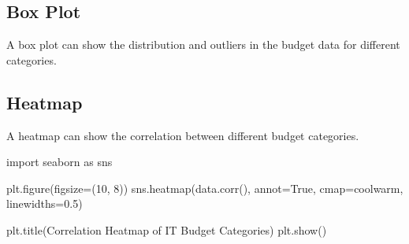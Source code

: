 \documentclass[
  letterpaper,
  DIV=11,
  numbers=noendperiod]{scrreprt}
\newenvironment{Shaded}{\begin{snugshade}}{\end{snugshade}}
\newcommand{\DecValTok}[1]{\textcolor[rgb]{0.68,0.00,0.00}{#1}}
\newcommand{\FloatTok}[1]{\textcolor[rgb]{0.68,0.00,0.00}{#1}}
\newcommand{\ImportTok}[1]{\textcolor[rgb]{0.00,0.46,0.62}{#1}}
\newcommand{\NormalTok}[1]{\textcolor[rgb]{0.00,0.23,0.31}{#1}}
\newcommand{\OperatorTok}[1]{\textcolor[rgb]{0.37,0.37,0.37}{#1}}
\newcommand{\StringTok}[1]{\textcolor[rgb]{0.13,0.47,0.30}{#1}}
\newcommand{\VariableTok}[1]{\textcolor[rgb]{0.07,0.07,0.07}{#1}}
\begin{document}
\subsection{Box Plot}\label{box-plot}

A box plot can show the distribution and outliers in the budget data for
different categories.

\begin{Shaded}
\end{Shaded}

\subsection{Heatmap}\label{heatmap}

A heatmap can show the correlation between different budget categories.

\begin{Shaded}
\begin{Highlighting}[]
\ImportTok{import}\NormalTok{ seaborn }\ImportTok{as}\NormalTok{ sns}

\NormalTok{plt.figure(figsize}\OperatorTok{=}\NormalTok{(}\DecValTok{10}\NormalTok{, }\DecValTok{8}\NormalTok{))}
\NormalTok{sns.heatmap(data.corr(), annot}\OperatorTok{=}\VariableTok{True}\NormalTok{, cmap}\OperatorTok{=}\StringTok{\textquotesingle{}coolwarm\textquotesingle{}}\NormalTok{, linewidths}\OperatorTok{=}\FloatTok{0.5}\NormalTok{)}

\NormalTok{plt.title(}\StringTok{\textquotesingle{}Correlation Heatmap of IT Budget Categories\textquotesingle{}}\NormalTok{)}
\NormalTok{plt.show()}
\end{Highlighting}
\end{Shaded}
\end{document}
